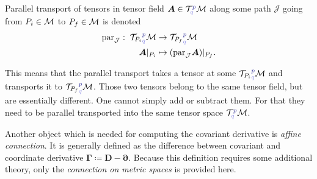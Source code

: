 \begin{definition}
    Parallel transport of tensors in tensor field $\bm A\in \TT^{\bluee p}_{\blueee q} \M$ along some path $\mathcal J$ going from $P_i\in\mathcal{M}$ to $P_f\in\mathcal{M}$ is denoted
    \begin{align*}
        \Par_{\mathcal J}:\; {\TT _{P_i}}^{\bluee p}_{\blueee q}\M&\rightarrow {\TT_{P_f}}^{\bluee p}_{\blueee q}\M\\
        \bm A|_{P_i} &\mapsto (\Par_{\mathcal J} \bm A)|_{P_f}.
    \end{align*}
\end{definition}
This means that the parallel transport takes a tensor at some ${\TT_{P_i}}^{\bluee p}_{\blueee q} \M$ and transports it to ${\TT_{P_f}}^{\bluee p}_{\blueee q} \M$.  Those two tensors belong to the same tensor field, but are essentially different. One cannot simply add or subtract them. For that they need to be parallel transported into the same tensor space $\TT^{\bluee p}_{\blueee q} \M$.


Another object which is needed for computing the covariant derivative is \emph{affine connection}. It is generally defined as the difference between covariant and coordinate derivative
$\bm \Gamma\coloneqq \bm D-\bm\partial$. Because this definition requires some additional theory, only the \emph{connection on metric spaces} is provided here.


